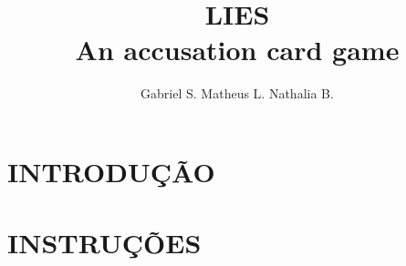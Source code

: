 \documentclass[a4paper, 11pt]{article}
\title{\textbf{LIES} \\ \small{An accusation card game}}
\author{Gabriel S. Matheus L. Nathalia B.}
\begin{document}
\maketitle

\newpage

\newpage

\section*{INTRODUÇÃO}


\section*{INSTRUÇÕES}

\end{document}
